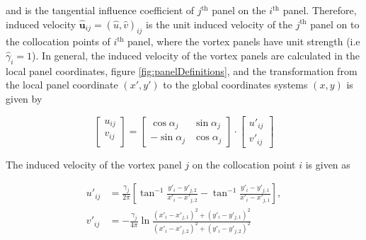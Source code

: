 and is the tangential influence coefficient of $j^{\mathrm{th}}$ panel on the $i^{\textrm{th}}$ panel. Therefore, induced velocity $\mathbf{\hat{u}}_{ij} = \left(\hat{u},\hat{v}\right)_{ij}$ is the unit induced velocity of the $j^{\mathrm{th}}$ panel on to the collocation points of $i^{\mathrm{th}}$ panel, where the vortex panels have unit strength (i.e $\hat{\gamma}_i = 1$). In general, the induced velocity of the vortex panels are calculated in the local panel coordinates, figure \ref{fig:panelDefinitions}, and the transformation from the local panel coordinate $(x',y')$ to the global coordinates systems $(x,y)$ is given by 

	\begin{equation}
	\begin{bmatrix}
	u_{ij}\\
	v_{ij}\\
	\end{bmatrix} = \begin{bmatrix}
	\cos\alpha_j & \sin\alpha_j \\
	-\sin\alpha_j & \cos\alpha_j
	\end{bmatrix} \cdot \begin{bmatrix}
	u'_{ij}\\
	v'_{ij}
	\end{bmatrix}
	\end{equation}

The induced velocity of the vortex panel $j$ on the collocation point $i$ is given as

	\begin{subequations}
	\begin{align}
	u'_{ij} &= \frac{\gamma_j}{2\pi}\left[\tan^{-1}\frac{y'_i-y'_{j,2}}{x'_i-x'_{j,2}} - \tan^{-1}\frac{y'_i-y'_{j,1}}{x'_i -x'_{j,1}}\right],\\
	v'_{ij} &= -\frac{\gamma_j}{4\pi}\ln\frac{\left(x'_i-x'_{j,1}\right)^2 + \left(y'_i-y'_{j,1}\right)^2}{\left(x'_i-x'_{j,2}\right)^2+\left(y'_i-y'_{j,2}\right)^2}
	\end{align}
	\end{subequations}

